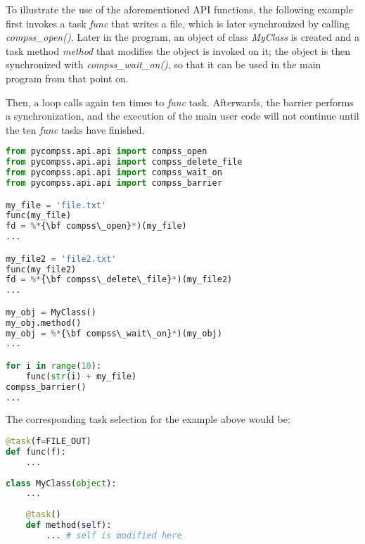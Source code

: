 To illustrate the use of the aforementioned API functions, the following example first invokes a task 
{\it func} that writes a file, which is later synchronized by calling {\it compss\_open()}. 
Later in the program, an object of class {\it MyClass} is created and a task method {\it method} 
that modifies the object is invoked on it; the object is then synchronized with {\it compss\_wait\_on()}, 
so that it can be used in the main program from that point on.

Then, a loop calls again ten times to {\it func} task.
Afterwards, the barrier performs a synchronization, and the execution of the main user code will
not continue until the ten {\it func} tasks have finished.

\begin{lstlisting}[language=python]
from pycompss.api.api import compss_open
from pycompss.api.api import compss_delete_file
from pycompss.api.api import compss_wait_on
from pycompss.api.api import compss_barrier

my_file = 'file.txt'
func(my_file)
fd = %*{\bf compss\_open}*)(my_file)
...

my_file2 = 'file2.txt'
func(my_file2)
fd = %*{\bf compss\_delete\_file}*)(my_file2)
...

my_obj = MyClass()
my_obj.method()
my_obj = %*{\bf compss\_wait\_on}*)(my_obj)
...

for i in range(10):
    func(str(i) + my_file)
compss_barrier()
...
\end{lstlisting}

The corresponding task selection for the example above would be:

\begin{lstlisting}[language=python]
@task(f=FILE_OUT)
def func(f):
    ...
    
class MyClass(object):
    ...
    
    @task()
    def method(self):
        ... # self is modified here
\end{lstlisting}

